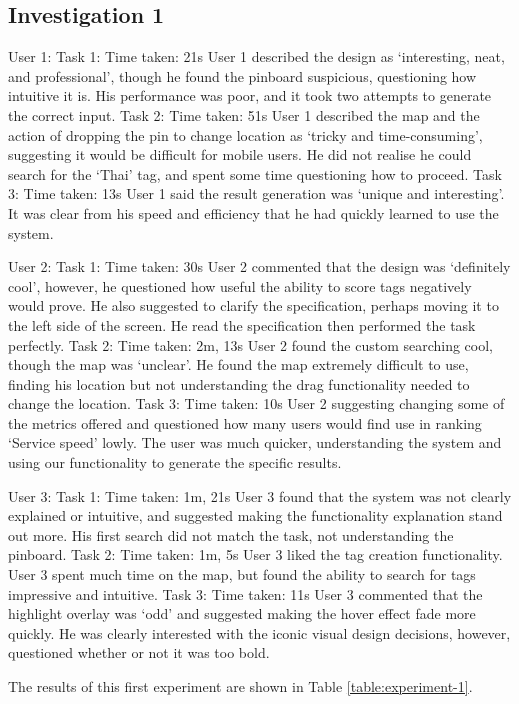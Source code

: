 \documentclass[10pt,a4paper]{article}
\begin{document}
\subsection*{Investigation 1}


User 1:
Task 1: 
Time taken: 21s
User 1 described the design as ‘interesting, neat, and professional’, though he found the pinboard suspicious, questioning how intuitive it is.
His performance was poor, and it took two attempts to generate the correct input.
Task 2:
Time taken: 51s
User 1 described the map and the action of dropping the pin to change location as ‘tricky and time-consuming’, suggesting it would be difficult for mobile users. 
He did not realise he could search for the ‘Thai’ tag, and spent some time questioning how to proceed.
Task 3:
Time taken: 13s
User 1 said the result generation was ‘unique and interesting’. It was clear from his speed and efficiency that he had quickly learned to use the system.

User 2:
Task 1:
Time taken: 30s
User 2 commented that the design was ‘definitely cool’, however, he questioned how useful the ability to score tags negatively would prove. He also suggested to clarify the specification, perhaps moving it to the left side of the screen.
He read the specification then performed the task perfectly.
Task 2:
Time taken: 2m, 13s
User 2 found the custom searching cool, though the map was ‘unclear’.
He found the map extremely difficult to use, finding his location but not understanding the drag functionality needed to change the location.
Task 3:
Time taken: 10s
User 2 suggesting changing some of the metrics offered and questioned how many users would find use in ranking ‘Service speed’ lowly.
The user was much quicker, understanding the system and using our functionality to generate the specific results.

User 3:
Task 1:
Time taken: 1m, 21s
User 3 found that the system was not clearly explained or intuitive, and suggested making the functionality explanation stand out more.
His first search did not match the task, not understanding the pinboard.
Task 2:
Time taken: 1m, 5s
User 3 liked the tag creation functionality.
User 3 spent much time on the map, but found the ability to search for tags impressive and intuitive.
Task 3:
Time taken: 11s
User 3 commented that the highlight overlay was ‘odd’ and suggested making the hover effect fade more quickly.
He was clearly interested with the iconic visual design decisions, however, questioned whether or not it was too bold.


The results of this first experiment are shown in Table \ref{table:experiment-1}.
\end{document}
